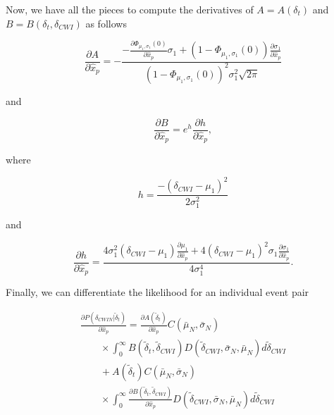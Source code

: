 \documentclass[12pt,double]{article}
\begin{document}
Now, we have all the pieces to compute the derivatives of $A=A(\delta_t)$ and $B = B(\delta_t,\delta_{CWI})$ as follows
\begin{linenomath*} \begin{equation}
\frac{\partial A} {\partial \hat{x}_p} =
-\frac{ -\frac{\partial  \Phi_{\mu_1,\sigma_1}(0)}{\partial \hat{x}_p} \sigma_1 +
 \left(1- \Phi_{\mu_1,\sigma_1}(0) \right) \frac{\partial \sigma_1}{\partial \hat{x}_p}}
{\left(1- \Phi_{\mu_1,\sigma_1}(0) \right)^2 \sigma_1^2 \sqrt{2 \pi}}
\end{equation} \end{linenomath*}
and
\begin{linenomath*} \begin{equation}
\frac{\partial B} {\partial \hat{x}_p} = e^h \frac{\partial h}{\partial \hat{x}_p},
\end{equation} \end{linenomath*}
where
\begin{linenomath*} \begin{equation}
h =  \frac{-(\delta_{CWI}-\mu_1)^2}{2 \sigma_1^2}
\end{equation} \end{linenomath*}
and
\begin{linenomath*} \begin{equation}
\frac{\partial h}{\partial \hat{x}_p} = \frac{
4 \sigma_1^2 (\delta_{CWI}-\mu_1) \frac{\partial \mu_1}{\partial \hat{x}_p}
+ 4(\delta_{CWI}-\mu_1)^2 \sigma_1 \frac{\partial \sigma_1}{\partial \hat{x}_p} }
{4 \sigma_1^4}.
\end{equation} \end{linenomath*}
Finally, we can differentiate the likelihood for an individual event pair
\begin{linenomath*} \begin{equation}
\begin{array}{l}
\frac{\partial P(\delta_{CWIN}|\widetilde{\delta}_t)} {\partial \hat{x}_p}  =
\frac{\partial A(\widetilde{\delta}_t)}{\partial \hat{x}_p} C(\bar{\mu}_N, \bar{\sigma}_N) \\
\hspace{2em} \times \int_0^\infty B(\widetilde{\delta}_t,\widetilde{\delta}_{CWI})
D(\widetilde{\delta}_{CWI},\bar{\sigma}_N,\bar{\mu}_N )
d\widetilde{\delta}_{CWI} \\
\hspace{2em} + A(\widetilde{\delta}_t) C(\bar{\mu}_N, \bar{\sigma}_N) \\
\hspace{2em} \times \int_0^\infty
\frac{\partial B(\widetilde{\delta}_t,\widetilde{\delta}_{CWI})} {\partial \hat{x}_p}
D(\widetilde{\delta}_{CWI},\bar{\sigma}_N,\bar{\mu}_N )
d\widetilde{\delta}_{CWI}
\end{array}
\end{equation} \end{linenomath*}
\end{document}
